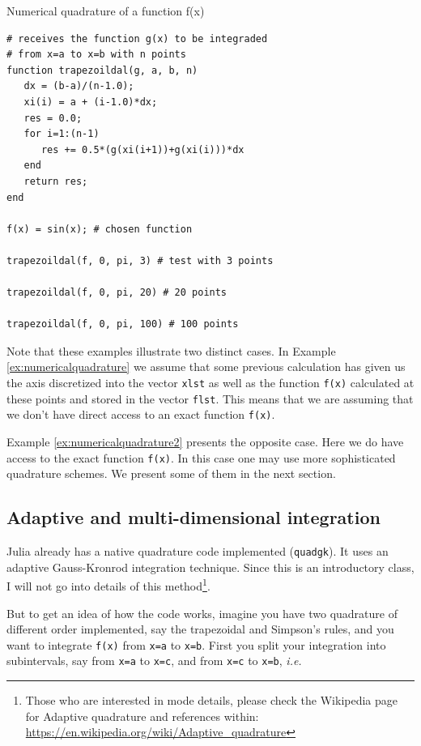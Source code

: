 \begin{example}{Numerical quadrature of a function f(x)}
\label{ex:numericalquadrature2}
\begin{verbatim}
# receives the function g(x) to be integraded
# from x=a to x=b with n points
function trapezoildal(g, a, b, n)
   dx = (b-a)/(n-1.0);
   xi(i) = a + (i-1.0)*dx;
   res = 0.0;	
   for i=1:(n-1)
      res += 0.5*(g(xi(i+1))+g(xi(i)))*dx
   end
   return res;
end

f(x) = sin(x); # chosen function

trapezoildal(f, 0, pi, 3) # test with 3 points

trapezoildal(f, 0, pi, 20) # 20 points

trapezoildal(f, 0, pi, 100) # 100 points
\end{verbatim}
\end{example}

Note that these examples illustrate two distinct cases. In Example \ref{ex:numericalquadrature} we assume that some previous calculation has given us the axis discretized into the vector \texttt{xlst} as well as the function \texttt{f(x)} calculated at these points and stored in the vector \texttt{flst}. This means that we are assuming that we don't have direct access to an exact function \texttt{f(x)}. 

Example \ref{ex:numericalquadrature2} presents the opposite case. Here we do have access to the exact function \texttt{f(x)}. In this case one may use more sophisticated quadrature schemes. We present some of them in the next section.

\subsection{Adaptive and multi-dimensional integration}

Julia already has a native quadrature code implemented (\texttt{quadgk}). It uses an adaptive Gauss-Kronrod integration technique. Since this is an introductory class, I will not go into details of this method\footnote{Those who are interested in mode details, please check the Wikipedia page for Adaptive quadrature and references within: \url{https://en.wikipedia.org/wiki/Adaptive_quadrature}}. 

But to get an idea of how the code works, imagine you have two quadrature of different order implemented, say the trapezoidal and Simpson's rules, and you want to integrate \texttt{f(x)} from \texttt{x=a} to \texttt{x=b}. First you split your integration into subintervals, say from \texttt{x=a} to \texttt{x=c}, and from \texttt{x=c} to \texttt{x=b}, \textit{i.e.}

